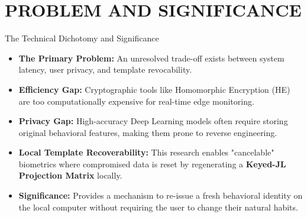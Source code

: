 
\section{PROBLEM AND SIGNIFICANCE}

\begin{frame}{The Technical Dichotomy and Significance}
    \begin{itemize}
        \item \textbf{The Primary Problem:} An unresolved trade-off exists between system latency, user privacy, and template revocability.
        \item \textbf{Efficiency Gap:} Cryptographic tools like Homomorphic Encryption (HE) are too computationally expensive for real-time edge monitoring.
        \item \textbf{Privacy Gap:} High-accuracy Deep Learning models often require storing original behavioral features, making them prone to reverse engineering.
        \item \textbf{Local Template Recoverability:} This research enables "cancelable" biometrics where compromised data is reset by regenerating a \textbf{Keyed-JL Projection Matrix} locally.
        \item \textbf{Significance:} Provides a mechanism to re-issue a fresh behavioral identity on the local computer without requiring the user to change their natural habits.
    \end{itemize}
\end{frame}